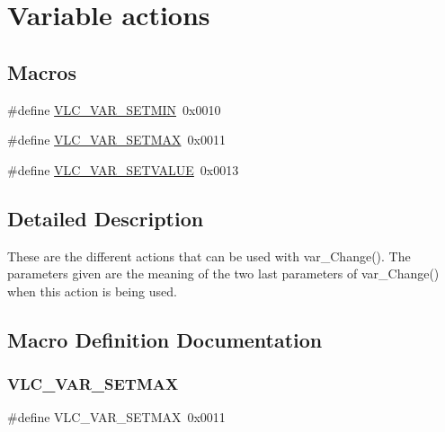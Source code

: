 \hypertarget{group__var__action}{}\section{Variable actions}
\label{group__var__action}
\subsection*{Macros}
\begin{DoxyCompactItemize}
\item 
\#define \hyperlink{group__var__action_ga08c33437e933c36bf8a4f9161bd747cb}{V\+L\+C\+\_\+\+V\+A\+R\+\_\+\+S\+E\+T\+M\+IN}~0x0010
\item 
\#define \hyperlink{group__var__action_ga84caef649e4a7adda139b76590d04270}{V\+L\+C\+\_\+\+V\+A\+R\+\_\+\+S\+E\+T\+M\+AX}~0x0011
\item 
\#define \hyperlink{group__var__action_ga37ba0bdb5c00c3bd042eb1efe0c751b1}{V\+L\+C\+\_\+\+V\+A\+R\+\_\+\+S\+E\+T\+V\+A\+L\+UE}~0x0013
\end{DoxyCompactItemize}


\subsection{Detailed Description}
These are the different actions that can be used with var\+\_\+\+Change(). The parameters given are the meaning of the two last parameters of var\+\_\+\+Change() when this action is being used. 

\subsection{Macro Definition Documentation}
\mbox{\label{group__var__action_ga84caef649e4a7adda139b76590d04270}} 
\subsubsection{\texorpdfstring{V\+L\+C\+\_\+\+V\+A\+R\+\_\+\+S\+E\+T\+M\+AX}{VLC\_VAR\_SETMAX}}
{\footnotesize\ttfamily \#define V\+L\+C\+\_\+\+V\+A\+R\+\_\+\+S\+E\+T\+M\+AX~0x0011}

